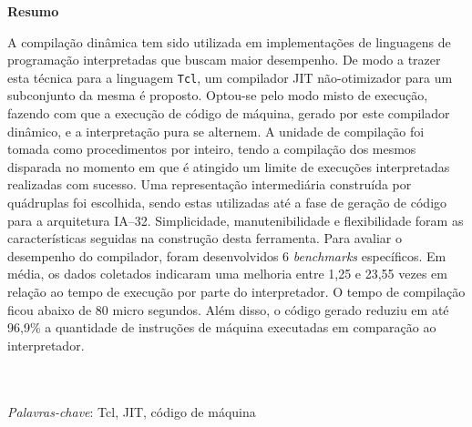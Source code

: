 
{
\Large
\begin{center}
\textbf{Resumo}
\end{center}
}

A compilação dinâmica tem sido utilizada em implementações de
linguagens de programação interpretadas que buscam maior
desempenho. De modo a trazer esta técnica para a linguagem
\texttt{Tcl}, um compilador JIT não-otimizador para um subconjunto
da mesma é proposto. Optou-se pelo modo misto de
execução, fazendo com que a execução de código de máquina, gerado por
este compilador dinâmico, e a interpretação pura se alternem. A
unidade de compilação foi tomada como procedimentos por inteiro, tendo
a compilação dos mesmos disparada no momento em que é atingido um
limite de execuções interpretadas realizadas com
sucesso. Uma representação intermediária construída por quádruplas foi
escolhida, sendo estas utilizadas até a fase de geração de código para
a arquitetura IA--32. Simplicidade, manutenibilidade e flexibilidade
foram as características seguidas na construção desta ferramenta.
Para avaliar o desempenho do compilador, foram desenvolvidos 6
\textit{benchmarks} específicos. Em média, os dados coletados
indicaram uma melhoria entre 1,25 e 23,55 vezes em relação ao tempo de
execução por parte do interpretador. O tempo de compilação ficou
abaixo de 80 micro segundos. Além disso, o código gerado reduziu em até
96,9\% a quantidade de instruções de máquina executadas em comparação
ao interpretador.

\quad\\
\quad\\
\textit{Palavras-chave}: Tcl, JIT, código de máquina

\pagebreak
